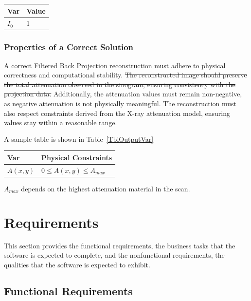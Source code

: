 \documentclass[12pt]{article}
\begin{document}
\begin{table}[!h]
\caption{Specification Parameter Values} \label{TblSpecParams}
\renewcommand{\arraystretch}{1.2}
\noindent \begin{longtable*}{l l}
  \toprule
  \textbf{Var} & \textbf{Value} \\
  \midrule
  $I_0$ & 1 \\
  \bottomrule
\end{longtable*}
\end{table}

\subsubsection{Properties of a Correct Solution} \label{sec_CorrectSolution}

\noindent
A correct Filtered Back Projection reconstruction must adhere to physical
correctness and computational stability. \st{The reconstructed image should preserve
the total attenuation observed in the sinogram, ensuring consistency with the
projection data.} Additionally, the attenuation values must remain non-negative,
as negative attenuation is not physically meaningful. The reconstruction must
also respect constraints derived from the X-ray attenuation model, ensuring
values stay within a reasonable range.

A sample table is shown in Table~\ref{TblOutputVar}

\begin{table}[!h]
\caption{Output Variables} \label{TblOutputVar}
\renewcommand{\arraystretch}{1.2}
\noindent \begin{longtable*}{l l}
  \toprule
  \textbf{Var} & \textbf{Physical Constraints} \\
  \midrule
  $A(x,y)$ & $0 \leq A(x,y) \leq A_{max}$\\
  \bottomrule
\end{longtable*}
\end{table}
$A_{max}$ depends on the highest attenuation material in the scan.
\section{Requirements} \label{requirement}
This section provides the functional requirements, the business tasks that the
software is expected to complete, and the nonfunctional requirements, the
qualities that the software is expected to exhibit.

\subsection{Functional Requirements}
\end{document}
